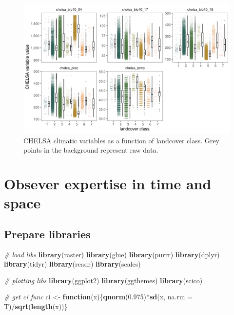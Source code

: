 \documentclass[]{article}
\newenvironment{Shaded}{}{}
\newcommand{\CommentTok}[1]{\textcolor[rgb]{0.38,0.63,0.69}{\textit{#1}}}
\newcommand{\ControlFlowTok}[1]{\textcolor[rgb]{0.00,0.44,0.13}{\textbf{#1}}}
\newcommand{\DataTypeTok}[1]{\textcolor[rgb]{0.56,0.13,0.00}{#1}}
\newcommand{\FloatTok}[1]{\textcolor[rgb]{0.25,0.63,0.44}{#1}}
\newcommand{\KeywordTok}[1]{\textcolor[rgb]{0.00,0.44,0.13}{\textbf{#1}}}
\newcommand{\NormalTok}[1]{#1}
\newcommand{\OperatorTok}[1]{\textcolor[rgb]{0.40,0.40,0.40}{#1}}
\newcommand{\StringTok}[1]{\textcolor[rgb]{0.25,0.44,0.63}{#1}}
\begin{document}
\begin{figure}
\centering
\includegraphics{figs/fig_climate_landcover.png}
\caption{CHELSA climatic variables as a function of landcover class. Grey points in the background represent raw data.}
\end{figure}

\hypertarget{obsever-expertise-in-time-and-space}{%
\section{Obsever expertise in time and space}\label{obsever-expertise-in-time-and-space}}

\hypertarget{prepare-libraries-4}{%
\subsection{Prepare libraries}\label{prepare-libraries-4}}

\begin{Shaded}
\begin{Highlighting}[]
\CommentTok{# load libs}
\KeywordTok{library}\NormalTok{(raster)}
\KeywordTok{library}\NormalTok{(glue)}
\KeywordTok{library}\NormalTok{(purrr)}
\KeywordTok{library}\NormalTok{(dplyr)}
\KeywordTok{library}\NormalTok{(tidyr)}
\KeywordTok{library}\NormalTok{(readr)}
\KeywordTok{library}\NormalTok{(scales)}

\CommentTok{# plotting libs}
\KeywordTok{library}\NormalTok{(ggplot2)}
\KeywordTok{library}\NormalTok{(ggthemes)}
\KeywordTok{library}\NormalTok{(scico)}

\CommentTok{# get ci func}
\NormalTok{ci <-}\StringTok{ }\ControlFlowTok{function}\NormalTok{(x)\{}\KeywordTok{qnorm}\NormalTok{(}\FloatTok{0.975}\NormalTok{)}\OperatorTok{*}\KeywordTok{sd}\NormalTok{(x, }\DataTypeTok{na.rm =}\NormalTok{ T)}\OperatorTok{/}\KeywordTok{sqrt}\NormalTok{(}\KeywordTok{length}\NormalTok{(x))\}}
\end{Highlighting}
\end{Shaded}
\end{document}
